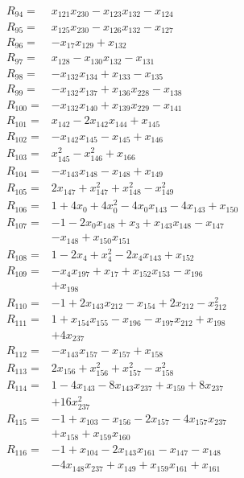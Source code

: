 \begin{align*}
R_{94}={}&x_{121}x_{230} -x_{123}x_{132} -x_{124}\\[3pt]
R_{95}={}&x_{125}x_{230} -x_{126}x_{132} -x_{127}\\[3pt]
R_{96}={}&-x_{17}x_{129} +x_{132}\\[3pt]
R_{97}={}&x_{128} -x_{130}x_{132} -x_{131}\\[3pt]
R_{98}={}&-x_{132}x_{134} +x_{133} -x_{135}\\[3pt]
R_{99}={}&-x_{132}x_{137} +x_{136}x_{228} -x_{138}\\[3pt]
R_{100}={}&-x_{132}x_{140} +x_{139}x_{229} -x_{141}\\[3pt]
R_{101}={}&x_{142} -2x_{142}x_{144} +x_{145}\\[3pt]
R_{102}={}&-x_{142}x_{145} -x_{145} +x_{146}\\[3pt]
R_{103}={}&x_{145}^{2} -x_{146}^{2} +x_{166}\\[3pt]
R_{104}={}&-x_{143}x_{148} -x_{148} +x_{149}\\[3pt]
R_{105}={}&2x_{147} +x_{147}^{2} +x_{148}^{2} -x_{149}^{2}\\[3pt]
R_{106}={}&1 +4x_{0} +4x_{0}^{2} -4x_{0}x_{143} -4x_{143} +x_{150}\\[3pt]
R_{107}={}&-1 -2x_{0}x_{148} +x_{3} +x_{143}x_{148} -x_{147}\\
&-x_{148} +x_{150}x_{151}\\[3pt]
R_{108}={}&1 -2x_{4} +x_{4}^{2} -2x_{4}x_{143} +x_{152}\\[3pt]
R_{109}={}&-x_{4}x_{197} +x_{17} +x_{152}x_{153} -x_{196}\\
&+x_{198}\\[3pt]
R_{110}={}&-1 +2x_{143}x_{212} -x_{154} +2x_{212} -x_{212}^{2}\\[3pt]
R_{111}={}&1 +x_{154}x_{155} -x_{196} -x_{197}x_{212} +x_{198}\\
&+4x_{237}\\[3pt]
R_{112}={}&-x_{143}x_{157} -x_{157} +x_{158}\\[3pt]
R_{113}={}&2x_{156} +x_{156}^{2} +x_{157}^{2} -x_{158}^{2}\\[3pt]
R_{114}={}&1 -4x_{143} -8x_{143}x_{237} +x_{159} +8x_{237}\\
&+16x_{237}^{2}\\[3pt]
R_{115}={}&-1 +x_{103} -x_{156} -2x_{157} -4x_{157}x_{237}\\
&+x_{158} +x_{159}x_{160}\\[3pt]
R_{116}={}&-1 +x_{104} -2x_{143}x_{161} -x_{147} -x_{148}\\
&-4x_{148}x_{237} +x_{149} +x_{159}x_{161} +x_{161}\\

\end{align*}
